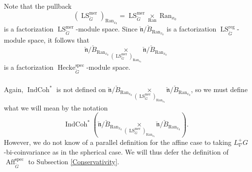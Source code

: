 \documentclass[10pt,a4paper]{amsart}
\newtheorem{rem}[subsubsection]{Remark}
\newcommand{\on}[1]{\operatorname{#1}}
\newcommand{\QCoh}{\on{QCoh}}
\newcommand{\IndCoh}{\on{IndCoh}}
\newcommand{\Gcheck}{\check{G}}
\newcommand{\ncheck}{\check{\mathfrak{n}}}
\newcommand{\Bcheck}{\check{B}}
\newcommand{\Ran}{\on{Ran}}
\newcommand{\sssec}[1]{\subsubsection{}}
\begin{document}

\sssec{}
Note that the pullback
$$
(\on{LS}_{\Gcheck}^{\on{mer}})_{\Ran_{x_0}} = \on{LS}_{\Gcheck}^{\on{mer}} \underset{\Ran}{\times} \Ran_{x_0}
$$
is a factorization $\on{LS}_{\Gcheck}^{\on{mer}}$-module space. Since $\ncheck/\Bcheck_{\Ran_{x_0}}$ is a factorization $\on{LS}_{\Gcheck}^{\on{reg}}$-module space, it follows that 
$$
\ncheck/\Bcheck_{\Ran_{x_0}} \underset{(\on{LS}_{\Gcheck}^{\on{mer}})_{\Ran_{x_0}}}{\times} \ncheck/\Bcheck_{\Ran_{x_0}}
$$
is a factorization $\on{Hecke}_{\Gcheck}^{\on{spec}}$-module space.

\sssec{}
Again, $\IndCoh^*$ is not defined on $\ncheck/\Bcheck_{\Ran_{x_0}} \underset{(\on{LS}_{\Gcheck}^{\on{mer}})_{\Ran_{x_0}}}{\times} \ncheck/\Bcheck_{\Ran_{x_0}}$, so we must define what we will mean by the notation 
$$
\IndCoh^*(\ncheck/\Bcheck_{\Ran_{x_0}} \underset{(\on{LS}_{\Gcheck}^{\on{mer}})_{\Ran_{x_0}}}{\times} \ncheck/\Bcheck_{\Ran_{x_0}}).
$$
However, we do not know of a parallel definition for the affine case to taking $L_{\nabla}^+G$-bi-coinvariance as in the spherical case. We will thus defer the definition of $\on{Aff}_{\Gcheck}^{\on{spec}}$ to Subsection \ref{Conservativity}.

\end{document}
